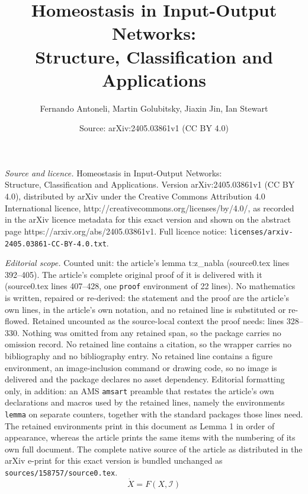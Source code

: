 \documentclass[10pt,a4paper]{amsart}
\title{Homeostasis in Input-Output Networks: \texorpdfstring{\\} {} Structure, Classification and Applications}
\author{Fernando Antoneli, Martin Golubitsky, Jiaxin Jin, Ian Stewart}
\date{Source: arXiv:2405.03861v1 (CC BY 4.0)}
\newcommand{\II}{{\mathcal I}}
\begin{document}
\maketitle

\noindent\emph{Source and licence.} Homeostasis in Input-Output Networks: \texorpdfstring{\\} {} Structure, Classification and Applications. Version arXiv:2405.03861v1 (CC BY 4.0), distributed by arXiv under the Creative Commons Attribution 4.0 International licence, http://creativecommons.org/licenses/by/4.0/, as recorded in the arXiv licence metadata for this exact version and shown on the abstract page https://arxiv.org/abs/2405.03861v1. Full licence notice: \texttt{licenses/arxiv-2405.03861-CC-BY-4.0.txt}.\par\smallskip

\noindent\textit{Editorial scope.} Counted unit: the article's lemma t:z\_nabla (source0.tex lines 392--405). The article's complete original proof of it is delivered with it (source0.tex lines 407--428, one \texttt{proof} environment of 22 lines). No mathematics is written, repaired or re-derived: the statement and the proof are the article's own lines, in the article's own notation, and no retained line is substituted or re-flowed.  Retained uncounted as the source-local context the proof needs: lines 328--330.  Nothing was omitted from any retained span, so the package carries no omission record.  No retained line contains a citation, so the wrapper carries no bibliography and no bibliography entry.  No retained line contains a figure environment, an image-inclusion command or drawing code, so no image is delivered and the package declares no asset dependency.  Editorial formatting only, in addition: an AMS \texttt{amsart} preamble that restates the article's own declarations and macros used by the retained lines, namely the environments \texttt{lemma} on separate counters, together with the standard packages those lines need.  The retained environments print in this document as Lemma 1 in order of appearance, whereas the article prints the same items with the numbering of its own full document.  The complete native source of the article as distributed in the arXiv e-print for this exact version is bundled unchanged as \texttt{sources/158757/source0.tex}.
\begin{equation} \label{general_dynamics}
  \dot{X} = F(X, \II)
\end{equation}
\end{document}
